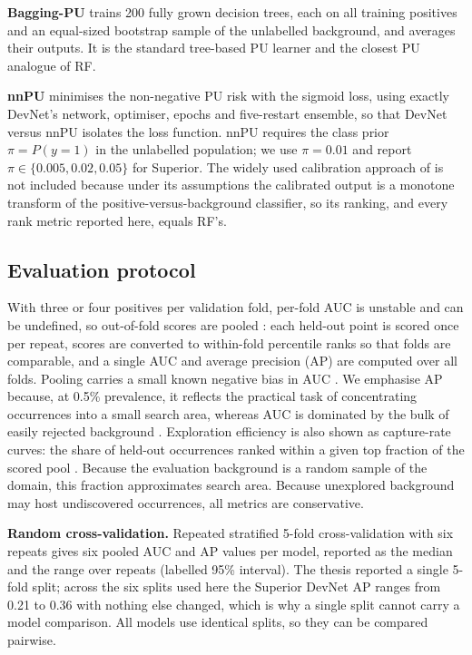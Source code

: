 \documentclass[pdflatex,sn-apa]{sn-jnl}
\begin{document}
\textbf{Bagging-PU} \citep{Mordelet2014} trains 200 fully grown decision trees, each on all training positives and an equal-sized bootstrap sample of the unlabelled background, and averages their outputs. It is the standard tree-based PU learner and the closest PU analogue of RF.

\textbf{nnPU} \citep{Kiryo2017} minimises the non-negative PU risk with the sigmoid loss, using exactly DevNet's network, optimiser, epochs and five-restart ensemble, so that DevNet versus nnPU isolates the loss function. nnPU requires the class prior $\pi = P(y=1)$ in the unlabelled population; we use $\pi = 0.01$ and report $\pi \in \{0.005, 0.02, 0.05\}$ for Superior. The widely used calibration approach of \citet{Elkan2008} is not included because under its assumptions the calibrated output is a monotone transform of the positive-versus-background classifier, so its ranking, and every rank metric reported here, equals RF's.

\subsection{Evaluation protocol}\label{sec:protocol}

With three or four positives per validation fold, per-fold AUC is unstable and can be undefined, so out-of-fold scores are pooled \citep{BradleyAP1997}: each held-out point is scored once per repeat, scores are converted to within-fold percentile ranks so that folds are comparable, and a single AUC and average precision (AP) are computed over all folds. Pooling carries a small known negative bias in AUC \citep{Airola2019,Parker2007}. We emphasise AP because, at 0.5\% prevalence, it reflects the practical task of concentrating occurrences into a small search area, whereas AUC is dominated by the bulk of easily rejected background \citep{Saito2015}. Exploration efficiency is also shown as capture-rate curves: the share of held-out occurrences ranked within a given top fraction of the scored pool \citep{Chung2003,Agterberg2005}. Because the evaluation background is a random sample of the domain, this fraction approximates search area. Because unexplored background may host undiscovered occurrences, all metrics are conservative.

\textbf{Random cross-validation.} Repeated stratified 5-fold cross-validation with six repeats gives six pooled AUC and AP values per model, reported as the median and the range over repeats (labelled 95\% interval). The thesis reported a single 5-fold split; across the six splits used here the Superior DevNet AP ranges from 0.21 to 0.36 with nothing else changed, which is why a single split cannot carry a model comparison. All models use identical splits, so they can be compared pairwise.
\end{document}

